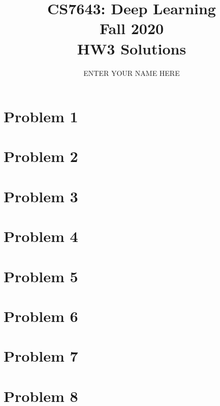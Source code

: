\documentclass[11pt,english]{article}
\begin{document}
\title{CS7643: Deep Learning \\
Fall 2020\\ HW3 Solutions}
\author{ENTER YOUR NAME HERE}
\maketitle


\newpage
\section*{Problem 1}

\newpage

\section*{Problem 2}

\newpage

\section*{Problem 3}

\newpage

\section*{Problem 4}

\newpage

\section*{Problem 5}

\newpage

\section*{Problem 6}

\newpage

\section*{Problem 7}

\newpage

\section*{Problem 8}
\end{document}
